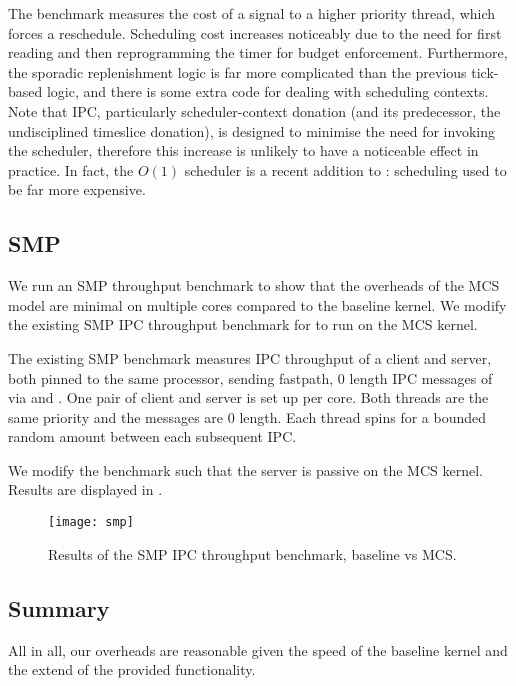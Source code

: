 The  benchmark measures the cost of a signal to a higher priority thread, which forces a reschedule.
Scheduling cost increases noticeably due to the need for first reading
and then reprogramming the timer for budget enforcement. Furthermore,
the sporadic replenishment logic is far more complicated than the
previous tick-based logic, and there is some extra code for
dealing with scheduling contexts. Note that \selfour IPC,
particularly scheduler-context donation (and its predecessor, the
undisciplined timeslice donation), is designed to minimise the need for
invoking the scheduler, therefore this increase is unlikely to have
a noticeable effect in practice. In fact, the \(O(1)\) scheduler is a
recent addition to \selfour: scheduling used to be far more expensive.



\subsection{SMP}

We run an SMP throughput benchmark to show that the overheads of the MCS model
are minimal on multiple cores compared to the baseline kernel. We modify the
existing SMP IPC throughput benchmark for \selfour to run on the MCS kernel. 

The existing SMP benchmark measures IPC throughput of a client and server, both 
pinned to the same processor, sending fastpath, 0 length IPC messages of via \call
and \replyrecv. One pair of client and server is set up per core. Both threads are
the same priority and the messages are 0 length. Each thread spins for a bounded
random amount between each subsequent IPC. 

We modify the benchmark such that the server is passive on the MCS kernel.
Results are displayed in .

\begin{figure}[ht]
    \centering
    \texttt{[image: smp]}
    \caption{Results of the SMP IPC throughput benchmark, baseline \selfour vs MCS.}
    \label{f:evaluation-smp}
\end{figure}

\subsection{Summary}


All in all, our overheads are reasonable given the speed of the baseline kernel and the extend of
the provided functionality.

